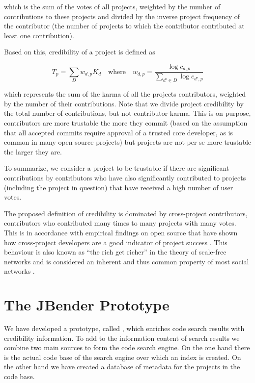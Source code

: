 \noindent
which is the sum of the votes of all projects, weighted by the number of contributions to these projects and divided by the inverse project frequency of the contributor (\ie the number of projects to which the contributor contributed at least one contribution).


Based on this, credibility of a project is defined as 

	$$T_{p} = \sum_{D} w_{d,p} K_d
	\quad \mathrm{where} \quad 
	w_{d,p} = \frac{\log c_{d,p}}{\sum_{d' \in D} \log c_{d',p}}$$

\noindent
which represents the sum of the karma of all the projects contributors, weighted by the number of their contributions.
Note that we divide project credibility by the total number of contributions, but not contributor karma. This is on purpose, contributors are more trustable the more they commit (based on the assumption that all accepted commits require approval of a trusted core developer, as is common in many open source projects) but projects are not per se more trustable the larger they are.

To summarize, we consider a project to be trustable if there are significant contributions by contributors who have also significantly contributed to projects (including the project in question) that have received a high number of user votes.

The proposed definition of credibility is dominated by cross-project contributors, \ie contributors who contributed many times to many projects with many votes. This is in accordance with empirical findings on open source that have shown how cross-project developers are a good indicator of project success \cite{Kats07a}. This behaviour is also known as ``the rich get richer'' in the theory of scale-free networks and is considered an inherent and thus common property of most social networks \cite{Bara03a}.

\section{The JBender Prototype}
\label{sec:approach}

We have developed a prototype, called \Jbd, which enriches code search results with credibility information. To add to the information content of search results we combine two main sources to form the \Jbd code search engine. On the one hand there is the actual code base of the search engine over which an index is created. On the other hand we have created a database of metadata for the projects in the code base. 

